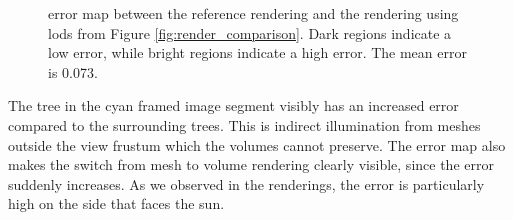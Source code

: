 \begin{figure}[ht]
    \centering
	\caption[\FLIP error map between reference and default \ac{lod} heuristic]{\FLIP error map between the reference rendering and the rendering using \acsp{lod} from Figure \ref{fig:render_comparison}. Dark regions indicate a low error, while bright regions indicate a high error. The mean \FLIP error is 0.073.}
	\label{fig:error_map}
\end{figure}
The tree in the cyan framed image segment visibly has an increased error compared to the surrounding trees.
This is indirect illumination from meshes outside the view frustum which the volumes cannot preserve.
The error map also makes the switch from mesh to volume rendering clearly visible, since the error suddenly increases.
As we observed in the renderings, the error is particularly high on the side that faces the sun.

